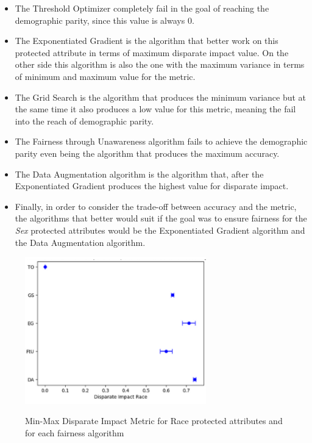 \begin{itemize}

    \item The Threshold Optimizer completely fail in the goal of reaching the demographic parity, since this value is always 0.

    \item The Exponentiated Gradient is the algorithm that better work on this protected attribute in terms of maximum disparate impact value. On the other side this algorithm is also the one with the maximum variance in terms of minimum and maximum value for the metric.

    \item The Grid Search is the algorithm that produces the minimum variance but at the same time it also produces a low value for this metric, meaning the fail into the reach of demographic parity.

    \item The Fairness through Unawareness algorithm fails to achieve the demographic parity even being the algorithm that produces the maximum accuracy.

    \item The Data Augmentation algorithm is the algorithm that, after the Exponentiated Gradient produces the highest value for disparate impact.

    \item Finally, in order to consider the trade-off between accuracy and the metric, the algorithms that better would suit if the goal was to ensure fairness for the \emph{Sex} protected attributes would be the Exponentiated Gradient algorithm and the Data Augmentation algorithm.

\end{itemize}


\begin{figure}[H]
    \centering
    \includegraphics[width=0.7\textwidth, height=0.7\textwidth]{dir.png}
    \label{fig:dir}
    \caption{Min-Max Disparate Impact Metric for Race protected attributes and for each fairness algorithm}
\end{figure}

